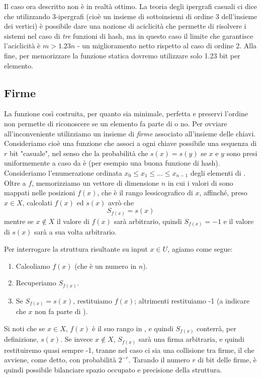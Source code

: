 Il caso ora descritto non è in realtà ottimo. La teoria degli ipergrafi casuali ci dice che utilizzando 3-ipergrafi (cioè un insieme di sottoinsiemi di ordine 3 dell'insieme dei vertici) è possibile dare una nozione di aciclicità che permette di risolvere i sistemi nel caso di \textit{tre} funzioni di hash, ma in questo caso il limite che garantisce l'aciclicità è $m > 1.23n$ - un miglioramento netto rispetto al caso di ordine 2.
Alla fine, per memorizzare la funzione statica  dovremo utilizzare solo 1.23 bit per elemento.
\subsection{Firme}
La funzione così costruita, per quanto sia minimale, perfetta e preservi l'ordine non permette di riconoscere se un elemento fa parte di  o no. Per ovviare all'inconveniente utilizziamo un insieme di \textit{firme} associato all'insieme  delle chiavi. Consideriamo cioè una funzione  che associ a ogni chiave possibile una sequenza di $r$ bit "casuale", nel senso che la probabilità che $s(x) = s(y)$ se $x$ e $y$ sono presi uniformemente a caso da  è  (per esempio una buona funzione di hash). Consideriamo l'enumerazione ordinata $x_0 \leq x_1 \leq \dots \leq x_{n - 1}$ degli elementi di . Oltre a $f$, memorizziamo
un vettore di dimensione $n$ in cui i valori di  sono mappati nelle posizioni $f(x)$, che è il rango lessicografico di $x$, affinché, preso $x \in X$, calcolati $f(x)$ ed $s(x)$ avrò che
\begin{equation*}
    S_{f(x)} = s(x)
\end{equation*}
mentre se $x \notin X$ il valore di $f(x)$ sarà arbitrario, quindi $S_{f(x)} = -1$ e il valore di $s(x)$ sarà a sua volta arbitrario.

Per interrogare la struttura risultante su input $x \in U$, agiamo come segue:
\begin{enumerate}
    \item Calcoliamo $f(x)$ (che è un numero in $n$).
    \item Recuperiamo $S_{f(x)}$.
    \item Se $S_{f(x)} = s(x)$, restituiamo $f(x)$; altrimenti restituiamo -1 (a indicare che $x$ non fa parte di ).
\end{enumerate}
Si noti che se $x \in X$, $f(x)$ è il suo rango in , e quindi $S_{f(x)}$ conterrà, per definizione, $s(x)$.
Se invece $x \notin X$, $S_{f(x)}$ sarà una firma arbitraria, e quindi restituiremo quasi sempre -1, tranne nel caso ci sia una collisione tra firme, il che avviene, come detto, con probabilità $2^{-r}$. Tarando il numero $r$ di bit delle firme, è quindi possibile bilanciare spazio occupato e precisione della struttura.

